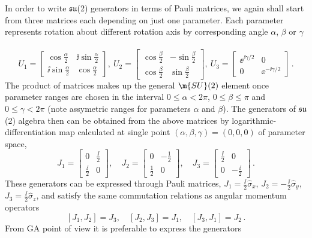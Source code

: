 \begin{example}
In order to write $\mathfrak{su}$(2) generators in terms of Pauli matrices,
we again shall start from three matrices each depending on just one parameter.
Each parameter represents rotation about different rotation axis by corresponding
angle $\alpha$, $\beta$ or $\gamma$~\cite{Sattinger86}
\[
U_1=\begin{bmatrix}\cos\tfrac{\alpha}{2}&\ii\sin\tfrac{\alpha}{2}\\\ii\sin\tfrac{\alpha}{2}&\cos\tfrac{\alpha}{2}\end{bmatrix},\
U_2=\begin{bmatrix}\cos\tfrac{\beta}{2}&-\sin\tfrac{\beta}{2}\\\cos\tfrac{\beta}{2}&\sin\tfrac{\beta}{2}\end{bmatrix},\
U_3=\begin{bmatrix}\ee^{\ii\gamma/2}&0\\0&\ee^{-\ii\gamma/2}\end{bmatrix}\,.
\]
The product of matrices makes  up the general $\m{SU}(2)$ element
once parameter ranges are chosen in the interval $0\le\alpha<
2\pi$, $0\le\beta\le \pi$ and $0\le\gamma < 2\pi$ (note assymetric ranges for parameters $\alpha$ and $\beta$). 
 The generators of
$\mathfrak{su}$(2) algebra then can be obtained from the above
matrices by logarithmic-differentiation map calculated at single
point $(\alpha,\beta,\gamma)=(0,0,0)$ of parameter space,
\[
J_1=\begin{bmatrix}0&\frac{\ii}{2}\\\frac{\ii}{2}&0\end{bmatrix},\quad
J_2=\begin{bmatrix}0&-\frac{1}{2}\\\frac{1}{2}&0\end{bmatrix},\quad
J_3=\begin{bmatrix}\frac{\ii}{2}&0\\0&-\frac{\ii}{2}\end{bmatrix}\,.
\]
These generators can be expressed through Pauli matrices,
$J_1=\tfrac{\ii}{2}\hat{\sigma}_x$,
$J_2=-\tfrac{\ii}{2}\hat{\sigma}_y$,
$J_3=\tfrac{\ii}{2}\hat{\sigma}_z$, and satisfy the same
commutation relations as angular momentum operators
\[[J_1,J_2]=J_3,\quad[J_2,J_3]=J_1,\quad[J_3,J_1]=J_2\,. \]
From GA point of view it is preferable to express the generators

\end{example}
